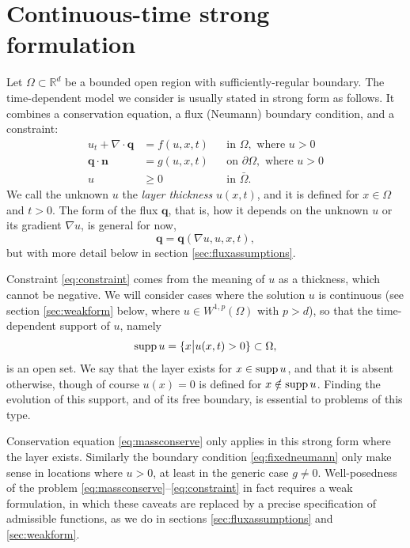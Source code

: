 \documentclass[final,leqno,onefignum,onetabnum]{siamltex1213bueler}
\newcommand\bn{\mathbf{n}}
\newcommand\bq{\mathbf{q}}
\newcommand{\Div}{\nabla\cdot}
\renewcommand{\grad}{\nabla}
\newcommand\RR{\mathbb{R}}
\begin{document}
\section{Continuous-time strong formulation}  \label{sec:strongform}

Let $\Omega \subset \RR^d$ be a bounded open region with sufficiently-regular boundary.  The time-dependent model we consider is usually stated in strong form as follows.  It combines a conservation equation, a flux (Neumann) boundary condition, and a constraint:
\begin{align}
u_t + \Div \bq &= f(u,x,t) &&\text{in } \Omega, \text{ where } u > 0 \label{eq:massconserve} \\
\bq \cdot \bn &= g(u,x,t) &&\text{on } \partial\Omega, \text{ where } u > 0 \label{eq:fixedneumann} \\
u &\ge 0 &&\text{in } \bar\Omega. \label{eq:constraint}
\end{align}
We call the unknown $u$ the \emph{layer thickness} $u(x,t)$, and it is defined for $x\in \Omega$ and $t>0$.  The form of the flux $\bq$, that is, how it depends on the unknown $u$ or its gradient $\grad u$, is general for now,
\begin{equation}
\bq = \bq(\grad u,u,x,t), \label{eq:fluxdepends}
\end{equation}
but with more detail below in section \ref{sec:fluxassumptions}.

Constraint \eqref{eq:constraint} comes from the meaning of $u$ as a thickness, which cannot be negative.  We will consider cases where the solution $u$ is continuous (see section \ref{sec:weakform} below, where $u\in W^{1,p}(\Omega)$ with $p>d$), so that the time-dependent support of $u$, namely
   $$\supp u = \{x \big| u(x,t) > 0\} \subset \Omega,$$
is an open set.  We say that the layer exists for $x\in \supp u$, and that it is absent otherwise, though of course $u(x)=0$ is defined for $x\notin \supp u$.  Finding the evolution of this support, and of its free boundary, is essential to problems of this type.

Conservation equation \eqref{eq:massconserve} only applies in this strong form where the layer exists.  Similarly the boundary condition \eqref{eq:fixedneumann} only make sense in locations where $u>0$, at least in the generic case $g\ne 0$.  Well-posedness of the problem \eqref{eq:massconserve}--\eqref{eq:constraint} in fact requires a weak formulation, in which these caveats are replaced by a precise specification of admissible functions, as we do in sections \ref{sec:fluxassumptions} and \ref{sec:weakform}.
\end{document}
